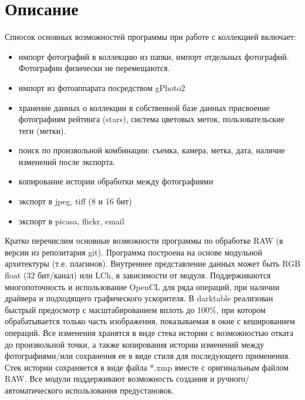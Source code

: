 \documentclass[10pt, a5paper]{article}
\begin{document}
\section*{Описание}
Спиосок основных возможностей программы при работе с коллекцией включает:
\begin{itemize}
\item импорт фотографий в коллекцию из папки, импорт отдельных фотографий. Фотографии физически не перемещаются.
\item импорт из фотоаппарата посредством gPhoto2
\item хранение данных о коллекции в собственной базе данных
присвоение фотографиям рейтинга (stars), система цветовых меток, пользовательские теги (метки).
\item поиск по произвольной комбинации: съемка, камера, метка, дата, наличие изменений после экспорта.
\item копирование истории обработки между фотографиями
\item экспорт в jpeg, tiff (8 и 16 бит) 
\item экспорт в picasa, flickr, email
	\end{itemize} 
Кратко перечислим основные возможности программы по обработке RAW (в версии из репозитария git). Программа построена на основе модульной архитектуры (т.е. плагинов). Внутреннее представление данных может быть RGB float (32 бит/канал) или LCh, в зависимости от модуля. Поддерживаются многопоточность и использование OpenCL для ряда операций, при наличии драйвера и подходящего графического ускорителя.
В darktable реализован быстрый предосмотр с масштабированием вплоть до 100\%, при котором обрабатывается только часть изображения, показываемая в окне с кешированием операций. Все изменения хранятся в виде стека истории с возможностью отката до произвольной точки, а также копирования истории изменений между фотографиями/или сохранения ее в виде стиля для последующего применения. Стек истории сохраняется в виде файла *.xmp вместе с оригинальным файлом RAW.
Все модули поддерживают возможность создания и ручного/автоматического использования предустановок. 
\begin{figure}[ht]
\end{figure}
\end{document}
